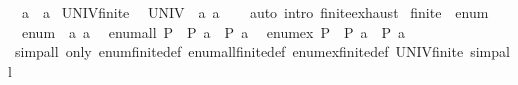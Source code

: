 \begin{isabellebody}
\ {\isacharparenleft}{\kern0pt}\ a\ \ {\isacharparenleft}{\kern0pt}{\isachardoublequoteopen}a\isanewline
\isanewline
{}\isamarkupfalse%
\ UNIV{\isacharunderscore}{\kern0pt}finite{\isacharunderscore}{\kern0pt}{}{\isacharcolon}{\kern0pt}\isanewline
\ \ {\isachardoublequoteopen}UNIV\ {\isacharequal}{\kern0pt}\ {\isacharbraceleft}{\kern0pt}a\ a\isanewline
%
\isadelimproof
\ \ %
\endisadelimproof
%
\isatagproof
{}\isamarkupfalse%
\ {\isacharparenleft}{\kern0pt}auto\ intro{\isacharcolon}{\kern0pt}\ finite{\isacharunderscore}{\kern0pt}{}{\isachardot}{\kern0pt}exhaust{\isacharparenright}{\kern0pt}%
\endisatagproof
{\isafoldproof}%
%
\isadelimproof
\isanewline
%
\endisadelimproof
\isanewline
{}\isamarkupfalse%
\ finite{\isacharunderscore}{\kern0pt}{}\ {\isacharcolon}{\kern0pt}{\isacharcolon}{\kern0pt}\ enum\isanewline
{}\isanewline
\isanewline
{}\isamarkupfalse%
\isanewline
\ \ {\isachardoublequoteopen}enum\ {\isacharequal}{\kern0pt}\ {\isacharbrackleft}{\kern0pt}a\ a\isanewline
\isanewline
{}\isamarkupfalse%
\isanewline
\ \ {\isachardoublequoteopen}enum{\isacharunderscore}{\kern0pt}all\ P\ {\isasymlongleftrightarrow}\ P\ a\ {\isasymand}\ P\ a\isanewline
\isanewline
{}\isamarkupfalse%
\isanewline
\ \ {\isachardoublequoteopen}enum{\isacharunderscore}{\kern0pt}ex\ P\ {\isasymlongleftrightarrow}\ P\ a\ {\isasymor}\ P\ a\isanewline
\isanewline
{}\isamarkupfalse%
%
\isadelimproof
\ %
\endisadelimproof
%
\isatagproof
{}\isamarkupfalse%
\isanewline
{}\isamarkupfalse%
\ {\isacharparenleft}{\kern0pt}simp{\isacharunderscore}{\kern0pt}all\ only{\isacharcolon}{\kern0pt}\ enum{\isacharunderscore}{\kern0pt}finite{\isacharunderscore}{\kern0pt}{}{\isacharunderscore}{\kern0pt}def\ enum{\isacharunderscore}{\kern0pt}all{\isacharunderscore}{\kern0pt}finite{\isacharunderscore}{\kern0pt}{}{\isacharunderscore}{\kern0pt}def\ enum{\isacharunderscore}{\kern0pt}ex{\isacharunderscore}{\kern0pt}finite{\isacharunderscore}{\kern0pt}{}{\isacharunderscore}{\kern0pt}def\ UNIV{\isacharunderscore}{\kern0pt}finite{\isacharunderscore}{\kern0pt}{}{\isacharcomma}{\kern0pt}\ simp{\isacharunderscore}{\kern0pt}all{\isacharparenright}{\kern0pt}%

\end{isabellebody}

